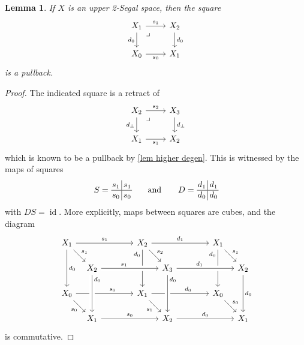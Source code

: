 \documentclass{amsart}
\newtheorem{lemma}[theorem]{Lemma}
\theoremstyle{definition}
\theoremstyle{remark}
\DeclareMathOperator{\id}{id}
\begin{document}
\begin{lemma}\label{lem bot degen}
If $X$ is an upper 2-Segal space, then the square
\[ \begin{tikzcd}
X_1 \rar{s_1} \dar[swap]{d_0} \ar[dr, phantom, "\lrcorner" very near start]  & X_2 \dar{d_0} \\
X_0  \rar[swap]{s_0} & X_1
\end{tikzcd} 
\]
is a pullback.
\end{lemma}
\begin{proof}
The indicated square is a retract of 
\[
\begin{tikzcd}
X_2 \rar{s_2} \dar[swap]{d_\bot} \ar[dr, phantom, "\lrcorner" very near start]  & X_3 \dar{d_\bot} \\
X_1  \rar[swap]{s_1} & X_2
\end{tikzcd} 
\]
which is known to be a pullback by \cref{lem higher degen}.
This is witnessed by the maps of squares
\[
\setlength\arraycolsep{1pt}
S = \,
\begin{matrix}
s_1 & \vline & s_1 \\
\hline
s_0 & \vline & s_0
\end{matrix}
\qquad
\text{and}
\qquad
D = 
\, \begin{matrix}
d_1 & \vline & d_1 \\
\hline
d_0 & \vline & d_0
\end{matrix}
\]
with $DS = \id$.
More explicitly, maps between squares are cubes, and the diagram
  \[
  \begin{tikzcd}[sep={30pt,between origins}]
      {X_1} \ar[rrr, "s_1"] \ar[dd, "d_0"] \ar[dr, "s_1"] & & & 
      {X_2} \ar[rrr, "d_1"] \ar[dd, "d_0"' very near start] \ar[dr, "s_2"] & & & 
      {X_1} \ar[dd, "d_0"' very near start] \ar[dr, "s_1"] & \\ &
      {X_2} \ar[rrr, pos=0.4, "s_1", crossing over]   & & & 
      {X_3} \ar[rrr, pos=0.4, "d_1", crossing over]   & & & 
      {X_2} \ar[dd,"d_0"] \\ 
      {X_0} \ar[rrr, pos=0.64, "s_0"] \ar[dr, "s_0"'] & & & 
      {X_1} \ar[rrr, pos=0.64, "d_0"] \ar[dr, "s_1"'] & & & 
      {X_0} \ar[dr, "s_0"] & \\ &
      {X_1} \ar[rrr, "s_0"] \ar[from=uu, crossing over, "d_0" very near start] & & &  
      {X_2} \ar[rrr, "d_0"] \ar[from=uu, crossing over, "d_0" very near start] & & &  
      {X_1}
  \end{tikzcd}
  \]
is commutative.
\end{proof}
\end{document}
